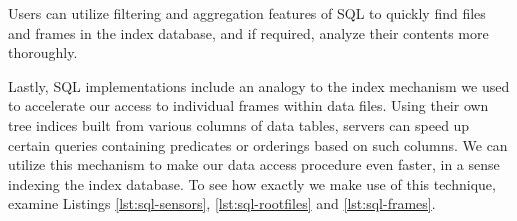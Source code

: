 Users can utilize filtering and aggregation features of SQL to quickly find files and frames in the index database, and if required, analyze their contents more thoroughly.

Lastly, SQL implementations include an analogy to the index mechanism we used to accelerate our access to individual frames within data files. Using their own tree indices built from various columns of data tables, servers can speed up certain queries containing predicates or orderings based on such columns. We can utilize this mechanism to make our data access procedure even faster, in a sense indexing the index database. To see how exactly we make use of this technique, examine Listings \ref{lst:sql-sensors}, \ref{lst:sql-rootfiles} and \ref{lst:sql-frames}.



